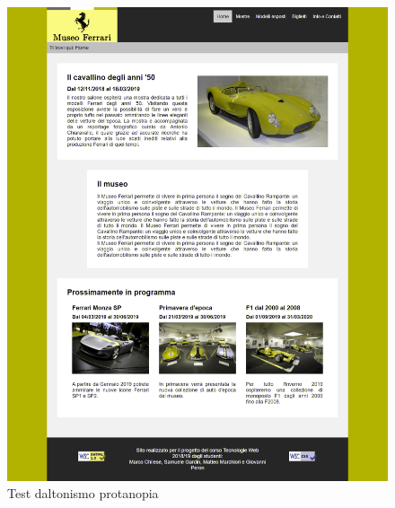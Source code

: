 \begin{figure}[!h]
\begin{center}
		\includegraphics[scale=0.6]{Images/protanopia.png}
		\caption{Test daltonismo protanopia}
	\end{center}
\end{figure}
